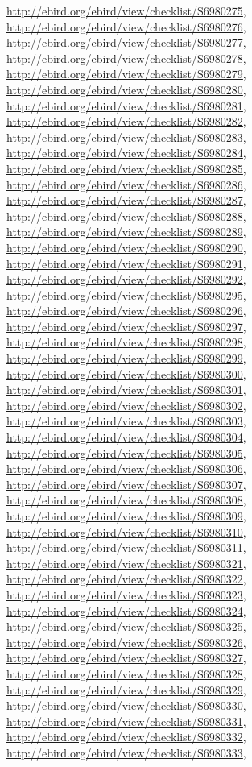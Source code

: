 \documentclass[9pt, article]{memoir}
\begin{document}
\begin{multicols}{2}
\url{http://ebird.org/ebird/view/checklist/S6980275}, 
\url{http://ebird.org/ebird/view/checklist/S6980276}, 
\url{http://ebird.org/ebird/view/checklist/S6980277}, 
\url{http://ebird.org/ebird/view/checklist/S6980278}, 
\url{http://ebird.org/ebird/view/checklist/S6980279}, 
\url{http://ebird.org/ebird/view/checklist/S6980280}, 
\url{http://ebird.org/ebird/view/checklist/S6980281}, 
\url{http://ebird.org/ebird/view/checklist/S6980282}, 
\url{http://ebird.org/ebird/view/checklist/S6980283}, 
\url{http://ebird.org/ebird/view/checklist/S6980284}, 
\url{http://ebird.org/ebird/view/checklist/S6980285}, 
\url{http://ebird.org/ebird/view/checklist/S6980286}, 
\url{http://ebird.org/ebird/view/checklist/S6980287}, 
\url{http://ebird.org/ebird/view/checklist/S6980288}, 
\url{http://ebird.org/ebird/view/checklist/S6980289}, 
\url{http://ebird.org/ebird/view/checklist/S6980290}, 
\url{http://ebird.org/ebird/view/checklist/S6980291}, 
\url{http://ebird.org/ebird/view/checklist/S6980292}, 
\url{http://ebird.org/ebird/view/checklist/S6980295}, 
\url{http://ebird.org/ebird/view/checklist/S6980296}, 
\url{http://ebird.org/ebird/view/checklist/S6980297}, 
\url{http://ebird.org/ebird/view/checklist/S6980298}, 
\url{http://ebird.org/ebird/view/checklist/S6980299}, 
\url{http://ebird.org/ebird/view/checklist/S6980300}, 
\url{http://ebird.org/ebird/view/checklist/S6980301}, 
\url{http://ebird.org/ebird/view/checklist/S6980302}, 
\url{http://ebird.org/ebird/view/checklist/S6980303}, 
\url{http://ebird.org/ebird/view/checklist/S6980304}, 
\url{http://ebird.org/ebird/view/checklist/S6980305}, 
\url{http://ebird.org/ebird/view/checklist/S6980306}, 
\url{http://ebird.org/ebird/view/checklist/S6980307}, 
\url{http://ebird.org/ebird/view/checklist/S6980308}, 
\url{http://ebird.org/ebird/view/checklist/S6980309}, 
\url{http://ebird.org/ebird/view/checklist/S6980310}, 
\url{http://ebird.org/ebird/view/checklist/S6980311}, 
\url{http://ebird.org/ebird/view/checklist/S6980321}, 
\url{http://ebird.org/ebird/view/checklist/S6980322}, 
\url{http://ebird.org/ebird/view/checklist/S6980323}, 
\url{http://ebird.org/ebird/view/checklist/S6980324}, 
\url{http://ebird.org/ebird/view/checklist/S6980325}, 
\url{http://ebird.org/ebird/view/checklist/S6980326}, 
\url{http://ebird.org/ebird/view/checklist/S6980327}, 
\url{http://ebird.org/ebird/view/checklist/S6980328}, 
\url{http://ebird.org/ebird/view/checklist/S6980329}, 
\url{http://ebird.org/ebird/view/checklist/S6980330}, 
\url{http://ebird.org/ebird/view/checklist/S6980331}, 
\url{http://ebird.org/ebird/view/checklist/S6980332}, 
\url{http://ebird.org/ebird/view/checklist/S6980333}, 

\end{multicols}
\end{document}
